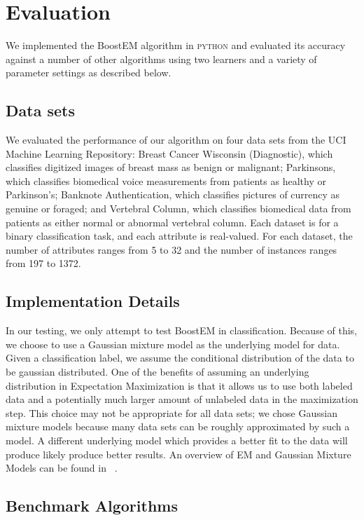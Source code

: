\documentclass{sig-alternate}
\begin{document}
\section{Evaluation}
We implemented the BoostEM algorithm in \textsc{python} and evaluated its accuracy against a number of other algorithms using two learners and a variety of parameter settings  as described below.


\subsection{Data sets}

We evaluated the performance of our algorithm on four data sets from the UCI Machine Learning Repository: Breast Cancer Wisconsin (Diagnostic), which classifies digitized images of breast mass as benign or malignant; Parkinsons, which classifies biomedical voice measurements from patients as healthy or Parkinson's; Banknote Authentication, which classifies pictures of currency as genuine or foraged; and Vertebral Column, which classifies biomedical data from patients as either normal or abnormal vertebral column. Each dataset is for a binary classification task, and each attribute is real-valued. For each dataset, the number of attributes ranges from 5 to 32 and the number of instances ranges from 197 to 1372. 

\subsection{Implementation Details}
In our testing, we only attempt to test BoostEM in classification.  Because of this, we choose to use a Gaussian mixture model as the underlying model for data. Given a classification label, we assume the conditional distribution of the data to be gaussian distributed. One of the benefits of assuming an underlying distribution in Expectation Maximization is that it allows us to use both labeled data and a potentially much larger amount of unlabeled data in the maximization step. This choice may not be appropriate for all data sets; we chose Gaussian mixture models because many data sets can be roughly approximated by such a model.  A different underlying model which provides a better fit to the data will produce likely produce better results.  An overview of EM and Gaussian Mixture Models can be found in ~\cite{zhu2009introduction}.

\subsection{Benchmark Algorithms}
\end{document}
